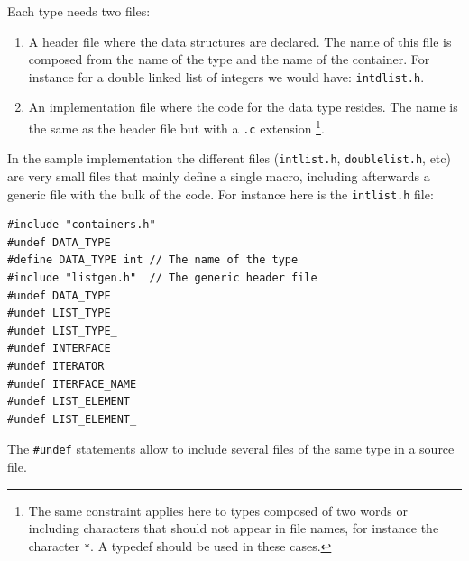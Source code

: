 \documentclass[12pt,a4paper,openany]{memoir} %
\begin{document}
{{Each type needs two files:
\begin{enumerate}
\item A header file where the data structures are declared. The name of this file is composed from the name of the type and the name of the
container. For instance for a double linked list of integers we would have: \verb,intdlist.h,.
\item An implementation file where the code for the data type resides. The name is the same as the header file but with a \verb,.c, extension
\footnote{The same constraint applies here to types composed of two words or including characters that should not appear in file names, for instance 
the character \texttt{*}. A typedef should be used in these cases.}.
\end{enumerate}

In the sample implementation the different files (\verb,intlist.h,, \verb,doublelist.h,, etc) are very small files that mainly define a single macro, 
including afterwards a generic file with the bulk of the code. For instance here is the \verb,intlist.h, file:
\begin{verbatim}
#include "containers.h"
#undef DATA_TYPE
#define DATA_TYPE int // The name of the type
#include "listgen.h"  // The generic header file
#undef DATA_TYPE
#undef LIST_TYPE
#undef LIST_TYPE_
#undef INTERFACE
#undef ITERATOR
#undef ITERFACE_NAME
#undef LIST_ELEMENT
#undef LIST_ELEMENT_
\end{verbatim}
The \verb,#undef, statements allow to include several files of the same type in a source file.
}}
\end{document}
